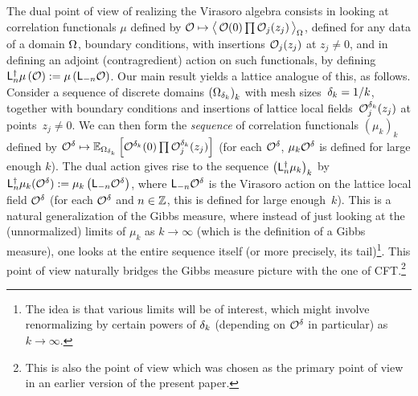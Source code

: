 \documentclass[12pt,oneside,english]{amsart}
\numberwithin{equation}{section}
\numberwithin{figure}{section}
\theoremstyle{plain}
\theoremstyle{plain}
\theoremstyle{plain}
\theoremstyle{plain}
\theoremstyle{remark}
\theoremstyle{definition}
\theoremstyle{plain}
\theoremstyle{plain}
\numberwithin{thm}{section}
\begin{document}
The dual point of view of realizing the Virasoro algebra consists
in looking at correlation functionals $\mu$ defined by 
${\mathcal{O}} \mapsto \big\langle\, {
{\mathcal{O}}(0) \prod{\mathcal{O}}_{j}(z_{j}) } \, \big\rangle_{{\Omega} }$,
defined for any data of a domain ${\Omega} $, boundary conditions, with
insertions ${\mathcal{O}}_{j}(z_{j}) $ at $z_{j}\neq0$,
and in defining an adjoint (contragredient)
action on such functionals,
by defining 
$\mathsf{L}_{n}^{\dagger} \mu \left({\mathcal{O}}\right)
:= \mu \left(\mathsf{L}_{-n}{\mathcal{O}}\right)$.
Our main result yields a lattice analogue of this, as follows.
Consider a sequence of
discrete domains $\left({\Omega}_{{\delta}_{k}}\right)_{k}$ with mesh
sizes~${\delta}_{k}=1/k$, together with boundary conditions and insertions of
lattice local fields~${\mathcal{O}}_{j}^{{\delta}_{k}}(z_{j})$
at points~$z_{j}\neq0$. We can then form the \emph{sequence} of correlation
functionals $\left(\mu_{k}\right)_{k}$ defined by 
${\mathcal{O}}^{{\delta}} \mapsto 
\mathbb{E}_{{\Omega}_{{\delta}_{k}}} \left[ { {\mathcal{O}}^{{\delta}_{k}}(0)
    \prod {\mathcal{O}}_{j}^{{\delta}_{k}} (z_{j}) } \right]$
(for each ${\mathcal{O}}^{{\delta}}$, $\mu_{k}{\mathcal{O}}^{{\delta}}$
is defined for large enough $k$). The dual %
action gives rise to the sequence
$\left(\mathsf{L}_{n}^{\dagger}\mu_{k}\right)_{k}$ by 
$\mathsf{L}_{n}^{\dagger}\mu_{k}({\mathcal{O}}^{{\delta}})
:= \mu_{k}\left(\mathsf{L}_{-n}{\mathcal{O}}^{{\delta}}\right)$,
where $\mathsf{L}_{-n}{\mathcal{O}}^{{\delta}}$ is the Virasoro action on the lattice
local field ${\mathcal{O}}^{{\delta}}$ (for each ${\mathcal{O}}^{{\delta}}$
and $n\in\mathbb{Z} $, this is defined for large enough~$k$). This
is a natural generalization of the Gibbs measure, where instead of
just looking at the (unnormalized) limits of $\mu_{k}$ as $k \to \infty$
(which is the definition of a Gibbs measure), one looks at the entire
sequence itself (or more precisely, its tail)\footnote{The idea
is that various limits will be of interest, which might involve
renormalizing by certain powers of ${\delta}_{k}$ (depending on 
${\mathcal{O}}^{{\delta}}$
in particular) as $k \to \infty$.}. This point of view naturally bridges the 
Gibbs measure picture with
the one of CFT.\footnote{This is also the point of view which was chosen as the 
primary point
of view in an earlier version of the present paper.}
\end{document}
